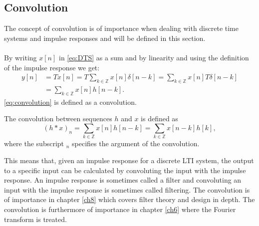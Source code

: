 \subsection{Convolution}
The concept of convolution is of importance when dealing with discrete time systems and impulse responses and will be defined in this section.\\\\
By writing $x[n]$ in \eqref{eq:DTS} as a sum and by linearity and using the definition of the impulse response we get:
\begin{align}
y[n]&=Tx[n]=T\sum_{k\in\mathbb{Z}}x[n]\delta[n-k]
=\sum_{k\in\mathbb{Z}}x[n]T\delta[n-k]\nonumber\\
&=\sum_{k\in\mathbb{Z}}x[n]h[n-k].\label{eq:convolution}
\end{align}
\eqref{eq:convolution} is defined as a convolution.
\begin{definition}\label{def:convolution}
The convolution between sequences $h$ and $x$ is defined as
\begin{equation}
(h*x)_n=\sum_{k\in\mathbb{Z}}x[n]h[n-k]=\sum_{k\in\mathbb{Z}}x[n-k]h[k],
\end{equation}
where the subscript $_n$ specifies the argument of the convolution.
\end{definition}
This means that, given an impulse response for a discrete LTI system, the output to a specific input can be calculated by convoluting the input with the impulse response. An impulse response is sometimes called a filter and convoluting an input with the impulse response is sometimes called filtering. The convolution is of importance in chapter \ref{ch8} which covers filter theory and design in depth. The convolution is furthermore of importance in chapter \ref{ch6} where the Fourier transform is treated. 










